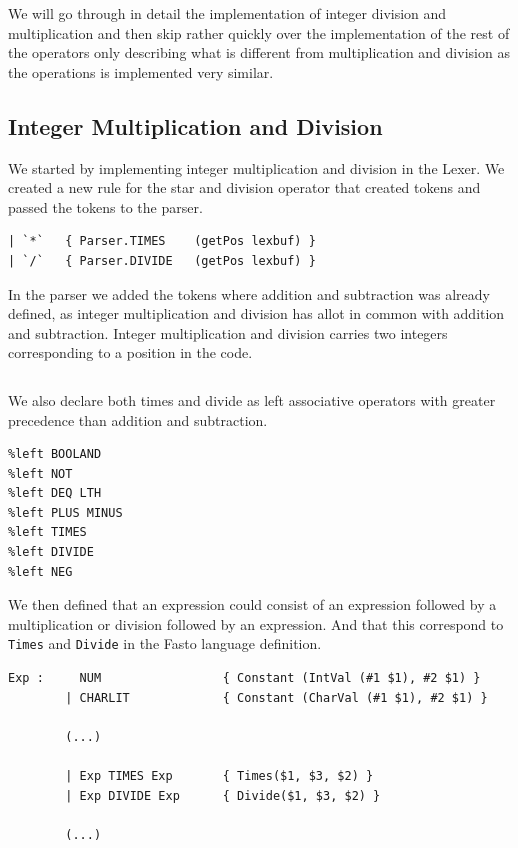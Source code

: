 \documentclass[11pt]{article}
\begin{document}
    We will go through in detail the implementation of integer division and
    multiplication and then skip rather quickly over the implementation of the
    rest of the operators only describing what is different from multiplication
    and division as the operations is implemented very similar.

    \subsection{Integer Multiplication and Division}
    We started by implementing integer multiplication and division in the Lexer.
    We created a new rule for the star and division operator that created tokens
    and passed the tokens to the parser.

    \begin{lstlisting}[basicstyle=\small]
| `*`   { Parser.TIMES    (getPos lexbuf) }
| `/`   { Parser.DIVIDE   (getPos lexbuf) }
    \end{lstlisting}

    In the parser we added the tokens where addition and subtraction was already
    defined, as integer multiplication and division has allot in common with
    addition and subtraction.  Integer multiplication and division carries two
    integers corresponding to a position in the code.

    \begin{lstlisting}[basicstyle=\small]
%token <(int*int)> PLUS MINUS TIMES DIVIDE DEQ EQ LTH BOOLAND BOOLOR NOT NEG
    \end{lstlisting}

    We also declare both times and divide as left associative operators with
    greater precedence than addition and subtraction.

    \begin{lstlisting}[basicstyle=\small]
%left BOOLOR
%left BOOLAND
%left NOT
%left DEQ LTH
%left PLUS MINUS
%left TIMES
%left DIVIDE
%left NEG
    \end{lstlisting}

    We then defined that an expression could consist of an expression followed
    by a multiplication or division followed by an expression.  And that this
    correspond to \texttt{Times} and \texttt{Divide} in the Fasto language
    definition.

    \begin{lstlisting}[basicstyle=\small]
Exp :     NUM                 { Constant (IntVal (#1 $1), #2 $1) }
        | CHARLIT             { Constant (CharVal (#1 $1), #2 $1) }

        (...)

        | Exp TIMES Exp       { Times($1, $3, $2) }
        | Exp DIVIDE Exp      { Divide($1, $3, $2) }

        (...)
    \end{lstlisting}
\end{document}

